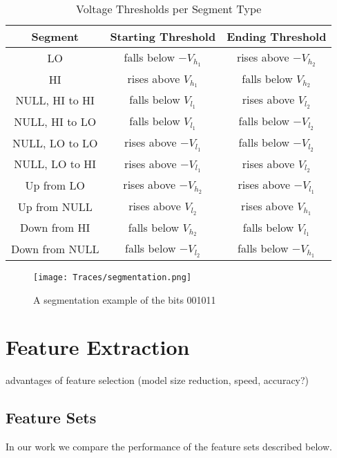 \documentclass[conference]{IEEEtran}
\begin{document}
  \begin{table}
    \caption{Voltage Thresholds per Segment Type}
    \label{tab:SegmentationLevels}
    \centering
    \begin{tabular}{|c c c|} 
      \hline
      Segment & Starting Threshold & Ending Threshold \\ [0.5ex] 
      \hline\hline
      LO & falls below $-V_{h_1}$ & rises above $-V_{h_2}$ \\
      \hline
      HI & rises above $V_{h_1}$ & falls below $V_{h_2}$ \\
      \hline
      NULL, HI to HI & falls below $V_{l_1}$ & rises above $V_{l_2}$ \\
      \hline
      NULL, HI to LO & falls below $V_{l_1}$ & falls below $-V_{l_2}$ \\
      \hline
      NULL, LO to LO & rises above $-V_{l_1}$ & falls below $-V_{l_2}$ \\
      \hline
      NULL, LO to HI & rises above $-V_{l_1}$ & rises above $V_{l_2}$ \\
      \hline
      Up from LO & rises above $-V_{h_2}$ & rises above $-V_{l_1}$ \\
      \hline
      Up from NULL & rises above $V_{l_2}$ & rises above $V_{h_1}$ \\
      \hline
      Down from HI & falls below $V_{h_2}$ & falls below $V_{l_1}$ \\
      \hline
      Down from NULL & falls below $-V_{l_2}$ & falls below $-V_{h_1}$ \\
      \hline
    \end{tabular}
  \end{table}
  
  \begin{figure}[t]
    \centering
    \texttt{[image: Traces/segmentation.png]}
    \caption{A segmentation example of the bits 001011}
    \label{fig:SegmentationTrace}
  \end{figure}
  
\section{Feature Extraction} \label{FeatureExtraction}
  \color{gray}
  advantages of feature selection (model size reduction, speed, accuracy?)
  \color{black}

\subsection{Feature Sets}
  In our work we compare the performance of the feature sets described below.
  
\end{document}
